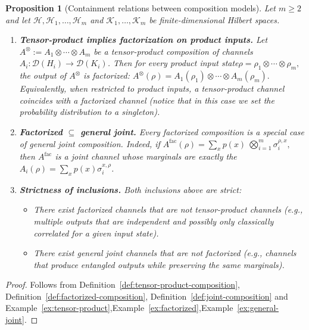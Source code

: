\documentclass[11pt]{article}
\theoremstyle{plain}
\newtheorem{proposition}[theo]{Proposition}
\theoremstyle{remark}
\begin{document}
\begin{proposition}[Containment relations between composition models]
\label{prop:composition-containment}
Let $m\ge 2$ and let $\mathcal{H},\mathcal{H}_1,\ldots,\mathcal{H}_m$ and
$\mathcal{K}_1,\ldots,\mathcal{K}_m$ be finite-dimensional Hilbert spaces.

\begin{enumerate}
\item\textbf{Tensor-product implies factorization on product inputs.}
Let $A^\otimes := A_1 \otimes \cdots \otimes A_m$ be a tensor-product
composition of channels $A_i : \mathcal D(H_i) \to \mathcal D(K_i)$.
Then for every product input state$
\rho = \rho_1 \otimes \cdots \otimes \rho_m,$
the output of $A^\otimes$ is factorized:
$
A^\otimes(\rho)
=
A_1(\rho_1)\otimes\cdots\otimes A_m(\rho_m).$
Equivalently, when restricted to product inputs, a tensor-product channel
coincides with a factorized channel (notice that in this case we set the probability distribution to a singleton).

\item \textbf{Factorized $\subseteq$ general joint.}
Every factorized composition is a special case of general joint composition.
Indeed, if
$
A^{\mathrm{fac}}(\rho)  =\sum_{x} p(x) \ \bigotimes_{i=1}^m \sigma_i^{\rho,x},
$
then $A^{\mathrm{fac}}$ is a joint channel whose marginals are exactly the $A_i(\rho)=\sum_x p(x) \sigma_i^{x,\rho}$.

\item \textbf{Strictness of inclusions.}
Both inclusions above are strict:
\begin{itemize}
\item There exist factorized channels that are not tensor-product channels (e.g., multiple outputs that are independent and possibly only classically correlated for a given input state).
\item There exist general joint channels that are not factorized (e.g., channels that produce
entangled outputs while preserving the same marginals).
\end{itemize}
\end{enumerate}
\end{proposition}

\begin{proof}
Follows from Definition~\ref{def:tensor-product-composition},
Definition~\ref{def:factorized-composition}, Definition~\ref{def:joint-composition} and Example~\ref{ex:tensor-product},Example~\ref{ex:factorized},Example~\ref{ex:general-joint}.
\end{proof}
\end{document}
